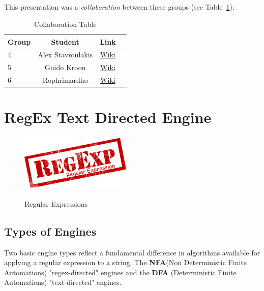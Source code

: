 \documentclass[a4paper,11pt]{report}
\begin{document}
\paragraph{}
This presentation was a \emph{collaboration} between these groups (see Table~\ref{tab:coltab1}): \\
 
\begin{table}[h]
\centering
 \begin{tabular}{| l | c | c | c |}
 \hline \textbf{Group} & \textbf{Student} & \textbf{Link} \\
 \hline 
 4 & Alex Stavroulakis & \href{https://www.os3.nl/2014-2015/students/alexandros_stavroulakis/es}{Wiki}\\
 \hline 
 5 & Guido Kroon & \href{https://www.os3.nl/2014-2015/students/guido_kroon/es/assignments1}{Wiki} \\ 
 \hline 
 6 & Rophrimardho & \href{https://www.os3.nl/2014-2015/students/rohprimardho/es/homework_1.3}{Wiki} \\ 
 \hline 
 \end{tabular} 
 \caption[Collaboration Table]{Collaboration Table}
 \label{tab:coltab1}
\end{table}

\chapter{RegEx Text Directed Engine}

\begin{figure}[h]
	\centering
		\includegraphics{images/regexp_logo.png}~\\[1cm]
		\caption{Regular Expressions}
		\label{fig:regex}
\end{figure}

\section{Types of Engines}
\begin{flushleft}
Two basic engine types reflect a fundamental difference in algorithms available for applying a regular expression to a string. The \textbf{NFA}(Non Deterministic Finite Automations) "regex-directed" engines and the \textbf{DFA} (Deterministic Finite Automations) "text-directed" engines. \cite{NFA,DFA}
\end{flushleft}
\end{document}
